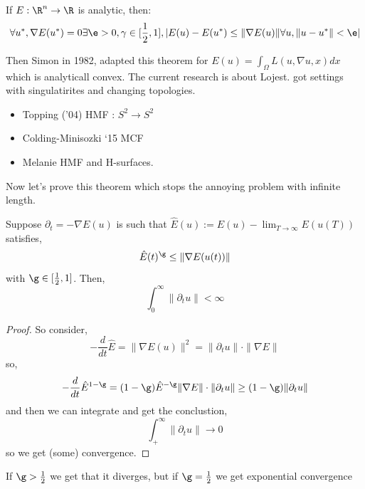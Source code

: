 \documentclass{article}
\begin{document}
\begin{nthm}[Lojasiewicz, 1962]
  If $E : \R^n \to \R$ is analytic, then:
  $$ \forall u^*, \nabla E(u^*) = 0 \exists \e > 0, \gamma \in [\frac{1}{2}, 1], |E(u) - E(u^*) \le \|\nabla E(u)\| \forall u, \|u - u^*\| < \e| $$
\end{nthm}
Then Simon in 1982, adapted this theorem for $E(u) = \int_\Omega L(u, \nabla u, x) dx$ which is analyticall convex. The current research is about Lojest. got settings with singulatirites and changing topologies.
\begin{itemize}
  \item Topping ('04) HMF : $S^2 \to S^2$
  \item Colding-Minisozki `15 MCF
  \item Melanie HMF and H-surfaces.
\end{itemize}

Now let's prove this theorem which stops the annoying problem with infinite length.

\begin{claim}
  Suppose $\partial_t = -\nabla E(u)$ is such that $\hat E(u) := E(u) - \lim_{T \to \infty} E(u(T))$ satisfies,
  $$ \hat E(t)^\g \le \|\nabla E(u(t))\| $$
  with $\g \in [\frac{1}{2}, 1]$. Then,
  $$ \int_0^\infty \|\partial_t u\| < \infty $$
\end{claim}
\begin{proof}
  So consider,
  $$ -\frac{d}{dt} \hat E = \|\nabla E(u)\|^2 = \|\partial_t u\|\cdot \|\nabla E\| $$
  so,
  $$ -\frac{d}{dt} \hat E^{1-\g} = (1 - \g) \hat E^{-\g}\|\nabla E\|\cdot \|\partial_t u\| \ge (1 - \g)\|\partial_t u\| $$
  and then we can integrate and get the conclustion,
  $$ \int_{+}^\infty \|\partial_t u\| \to 0 $$
  so we get (some) convergence.
\end{proof}

If $\g > \frac{1}{2}$ we get that it diverges, but if $\g = \frac{1}{2}$ we get exponential convergence
\end{document}
